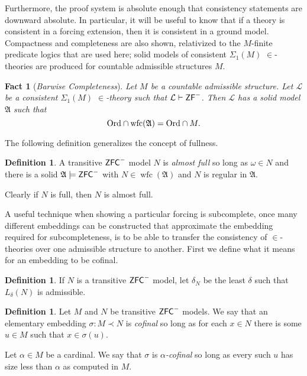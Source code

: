 \documentclass{amsart}
\newtheorem{fact}[theorem]{Fact}
\theoremstyle{definition}
\newtheorem{definition}[theorem]{Definition}
\theoremstyle{remark}
\newcommand{\ZFC}{\textup{\ensuremath{\textsf{ZFC}}}}
\newcommand{\Ord}{\textup{\ensuremath{\text{Ord}}}}
\DeclareMathOperator{\wfc}{wfc}
\begin{document}
Furthermore, the proof system is absolute enough that consistency statements are downward absolute. In particular, it will be useful to know that if a theory is consistent in a forcing extension, then it is consistent in a ground model. Compactness and completeness are also shown, relativized to the $M$-finite predicate logics that are used here; solid models of consistent $\Sigma_1(M)$ $\in$-theories are produced for countable admissible structures $M$. 

\begin{fact}[\emph{Barwise Completeness}] \label{fact:completeness} Let $M$ be a countable admissible structure. Let $\mathcal L$ be a consistent $\Sigma_1(M)$ $\in$-theory such that $\mathcal L \vdash \textsf{\textup{ZF}}^-$. Then $\mathcal L$ has a solid model $\mathfrak A$ such that $$\Ord \cap \wfc(\mathfrak A) = \Ord \cap M.$$ \end{fact}

The following definition generalizes the concept of fullness.
\begin{definition} A transitive $\ZFC^-$ model $N$ is \emph{almost full} so long as $\omega \in N$ and there is a solid $\mathfrak A \models \ZFC^-$ with $N \in \wfc(\mathfrak A)$ and $N$ is regular in $\mathfrak A$. \end{definition}
Clearly if $N$ is full, then $N$ is almost full.

A useful technique when showing a particular forcing is subcomplete, once many different embeddings can be constructed that approximate the embedding required for subcompleteness, is to be able to transfer the consistency of $\in$-theories over one admissible structure to another. First we define what it means for an embedding to be cofinal.

\begin{definition} If $N$ is a transitive $\ZFC^-$ model, let $\delta_N$ be the least $\delta$ such that $L_\delta(N)$ is admissible. \end{definition}

\begin{definition} Let $M$ and $N$ be transitive $\ZFC^-$ models. We say that an elementary embedding $\sigma: M \prec N$ is \emph{cofinal} so long as for each $x \in N$ there is some $u \in M$ such that $x \in \sigma(u)$. 

Let $\alpha \in M$ be a cardinal. We say that $\sigma$ is \emph{$\alpha$-cofinal} so long as every such $u$ has size less than $\alpha$ as computed in $M$. \end{definition}
\end{document}
